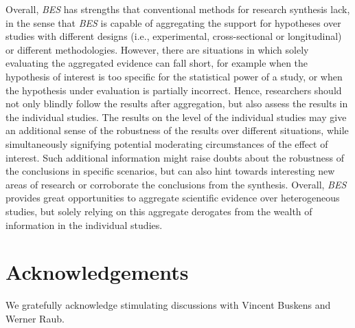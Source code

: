 \documentclass[
]{article}
\begin{document}
Overall, \emph{BES} has strengths that conventional methods for research
synthesis lack, in the sense that \emph{BES} is capable of aggregating
the support for hypotheses over studies with different designs (i.e.,
experimental, cross-sectional or longitudinal) or different
methodologies. However, there are situations in which solely evaluating
the aggregated evidence can fall short, for example when the hypothesis
of interest is too specific for the statistical power of a study, or
when the hypothesis under evaluation is partially incorrect. Hence,
researchers should not only blindly follow the results after
aggregation, but also assess the results in the individual studies. The
results on the level of the individual studies may give an additional
sense of the robustness of the results over different situations, while
simultaneously signifying potential moderating circumstances of the
effect of interest. Such additional information might raise doubts about
the robustness of the conclusions in specific scenarios, but can also
hint towards interesting new areas of research or corroborate the
conclusions from the synthesis. Overall, \emph{BES} provides great
opportunities to aggregate scientific evidence over heterogeneous
studies, but solely relying on this aggregate derogates from the wealth
of information in the individual studies.

\hypertarget{acknowledgements}{%
\section{Acknowledgements}\label{acknowledgements}}

We gratefully acknowledge stimulating discussions with Vincent Buskens
and Werner Raub.


\renewcommand\refname{References}
  
\end{document}
